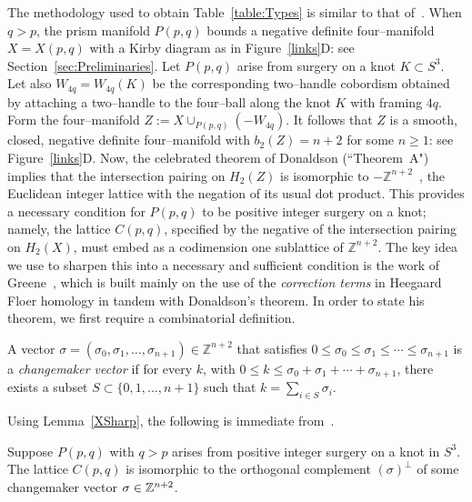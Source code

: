 The methodology used to obtain Table~\ref{table:Types} is similar to that of~\cite{greene:LSRP,Prism2016}.  When $q>p$, the prism manifold $P(p,q)$ bounds a negative definite four--manifold $X=X(p,q)$ with a Kirby diagram as in Figure~\ref{links}D: see Section~\ref{sec:Preliminaries}. Let $P(p,q)$ arise from surgery on a knot $K\subset S^3$. Let also $W_{4q}=W_{4q}(K)$ be the corresponding two--handle cobordism obtained by attaching a two--handle to the four--ball along the knot $K$ with framing $4q$. Form the four--manifold $Z:=X\cup_{P(p,q)}(-W_{4q})$. It follows that $Z$ is a smooth, closed, negative definite four--manifold with $b_2(Z)=n+2$ for some $n\ge 1$: see Figure~\ref{links}D. Now, the celebrated theorem of Donaldson (``Theorem~A") implies that the intersection pairing on $H_2(Z)$ is isomorphic to $-\mathbb Z^{n+2}$~\cite{Donaldson1983}, the Euclidean integer lattice with the negation of its usual dot product. This provides a necessary condition for $P(p,q)$ to be positive integer surgery on a knot; namely, the lattice $C(p,q)$, specified by the negative of the intersection pairing on $H_2(X)$, must embed as a codimension one sublattice of $\mathbb Z^{n+2}$. The key idea we use to sharpen this into a necessary and sufficient condition is the work of Greene~\cite{greene:LSRP}, which is built mainly on the use of the {\it correction terms} in Heegaard Floer homology in tandem with Donaldson's theorem. In order to state his theorem, we first require a combinatorial definition.  
\begin{definition}\label{defn:changemaker}
A vector $\sigma=(\sigma_0,\sigma_1,\dots,\sigma_{n+1})\in\mathbb Z^{n+2}$ that satisfies $0\le\sigma_0\le\sigma_1\le\cdots\le\sigma_{n+1}$ is a {\it changemaker vector} if for every $k$, with $0\le k\le\sigma_0+\sigma_1+\cdots+\sigma_{n+1}$, there exists a subset $S\subset\{0,1,\dots,n+1\}$
such that $k=\sum_{i\in S}\sigma_i$.
\end{definition}

Using Lemma~\ref{XSharp}, the following is immediate from~\cite[Theorem~3.3]{Greene2015}.

\begin{theorem}\label{changemakerlatticeembedding}
Suppose $P(p, q)$ with $q>p$ arises from positive integer surgery on a knot in $S^3$. The lattice $C(p, q)$ is isomorphic to the orthogonal complement $(\sigma)^\perp$ of some changemaker vector $\sigma \in \mathbb{Z}^{n+2}$.
\end{theorem}



